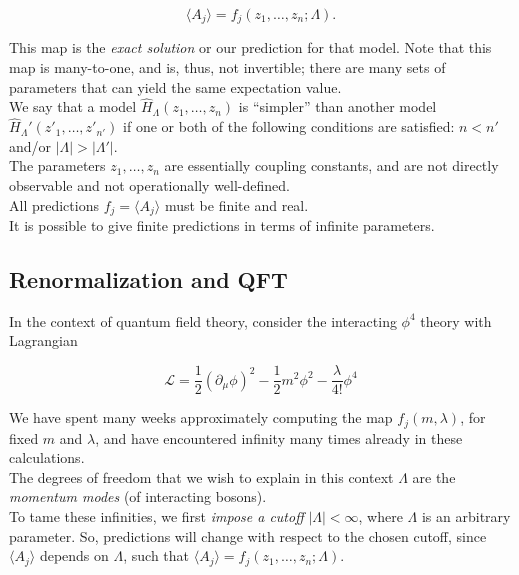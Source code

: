 \begin{equation}
\langle A_j \rangle = f_j (z_1, \dots, z_n; \Lambda).
\end{equation}

\noindent This map is the \textit{exact solution} or our prediction for that model. Note that this map is many-to-one, and is, thus, not invertible; there are many sets of parameters that can yield the same expectation value. \\

\noindent We say that a model $\hat{H}_\Lambda  (z_1, \dots, z_n)$ is ``simpler'' than another model $\hat{H}_\Lambda'  (z'_1, \dots, z'_{n'})$ if one or both of the following conditions are satisfied: $n < n'$ and/or $|\Lambda| > |\Lambda'|$. \\

\noindent The parameters $z_1, \dots, z_n$ are essentially coupling constants, and are not directly observable and not operationally well-defined. \\

\noindent All predictions $f_j = \langle A_j \rangle$ must be finite and real. \\

\noindent It is possible to give finite predictions in terms of infinite parameters. 

\subsection*{Renormalization and QFT}

\noindent In the context of quantum field theory, consider the interacting $\phi^4$ theory with Lagrangian

\begin{equation}
\mathcal{L} = \frac{1}{2} (\partial_\mu \phi)^2 - \frac{1}{2} m^2 \phi^2 - \frac{\lambda}{4!} \phi^4
\end{equation}

\noindent We have spent many weeks approximately computing the map $f_j (m, \lambda)$, for fixed $m$ and $\lambda$, and have encountered infinity many times already in these calculations. \\

\noindent The degrees of freedom that we wish to explain in this context $\Lambda$ are the \textit{momentum modes} (of interacting bosons). \\

\noindent To tame these infinities, we first \textit{impose a cutoff} $|\Lambda| < \infty$, where $\Lambda$ is an arbitrary parameter. So, predictions will change with respect to the chosen cutoff, since $\langle A_j \rangle$ depends on $\Lambda$, such that $\langle A_j \rangle = f_j (z_1, \dots, z_n; \Lambda)$. \\

